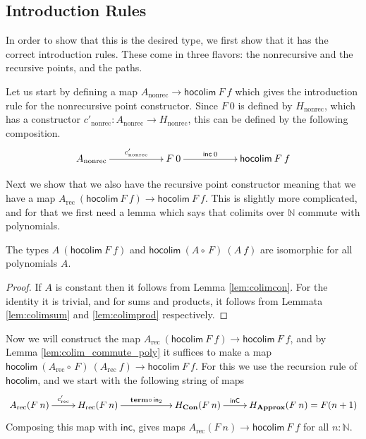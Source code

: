 \documentclass[a4paper,UKenglish]{lipics-v2016}
\newcommand{\Boperator}[1]{\mathsf{#1}}
\newcommand{\inn}{\Boperator{in}}
\newcommand{\comp}[0]{\circ \,}
\newcommand{\rec}[0]{\operatorname{rec}}
\newcommand{\nonrec}[0]{\operatorname{nonrec}}
\newcommand{\term}[0]{\textbf{term}}
\newcommand{\Con}[0]{\textbf{Con}}
\newcommand{\Approx}[0]{\textbf{Approx}}
\newcommand{\inC}[0]{\Boperator{inC}}
\newcommand{\hocolim}[0]{\Boperator{hocolim}}
\newcommand{\inc}[0]{\Boperator{inc}}
\begin{document}
\subsection{Introduction Rules}
In order to show that this is the desired type, we first show that it has the correct introduction rules.
These come in three flavors: the nonrecursive and the recursive points, and the paths.

Let us start by defining a map $A_{\nonrec} \rightarrow \hocolim \> F \> f$ which gives the introduction rule for the nonrecursive point constructor.
Since $F \> 0$ is defined by $H_{\nonrec}$, which has a constructor $c'_{\nonrec} : A_{\nonrec} \rightarrow H_{\nonrec}$, this can be defined by the following composition.
\[
\xymatrix
{
        A_{\nonrec} \ar[rr]^-{c'_{\nonrec}}
                & & F \> 0 \ar[rr]^-{\inc \> 0}
                & & \hocolim \> F \> f
}
\]

Next we show that we also have the recursive point constructor meaning that we have a map $A_{\rec} \> (\hocolim \> F \> f) \rightarrow \hocolim \> F \> f$.
This is slightly more complicated, and for that we first need a lemma which says that colimits over $\mathbb{N}$ commute with polynomials.

\begin{lemma}
\label{lem:colim_commute_poly}
The types $A \> (\hocolim \> F \> f)$ and $\hocolim \> (A \comp F) \> (A \> f)$ are isomorphic for all polynomials $A$.
\end{lemma}

\begin{proof}
If $A$ is constant then it follows from Lemma \ref{lem:colimcon}.
For the identity it is trivial, and for sums and products, it follows from Lemmata \ref{lem:colimsum} and \ref{lem:colimprod} respectively. 
\end{proof}

Now we will construct the map $A_{\rec} \> (\hocolim \> F \> f) \rightarrow \hocolim \> F \> f$, and by Lemma \ref{lem:colim_commute_poly} it suffices to make a map $\hocolim \> (A_{\rec} \comp F) \> (A_{\rec} \> f) \rightarrow \hocolim \> F \> f$.
For this we use the recursion rule of $\hocolim$, and we start with the following string of maps
\[
\xymatrix
{
                A_{\rec}(F \> n) \ar[r]^-{c_{\rec}'} 
                & H_{\rec}(F \> n) \ar[rr]^-{\term \comp \inn_2} &
                & H_{\Con}(F \> n) \ar[r]^-{\inC}
                & H_{\Approx}(F \> n) = F(n + 1)
}
\]
Composing this map with $\inc$, gives maps $A_{\rec}(F \> n) \rightarrow \hocolim \> F \> f$ for all $n : \mathbb{N}$.
\end{document}

